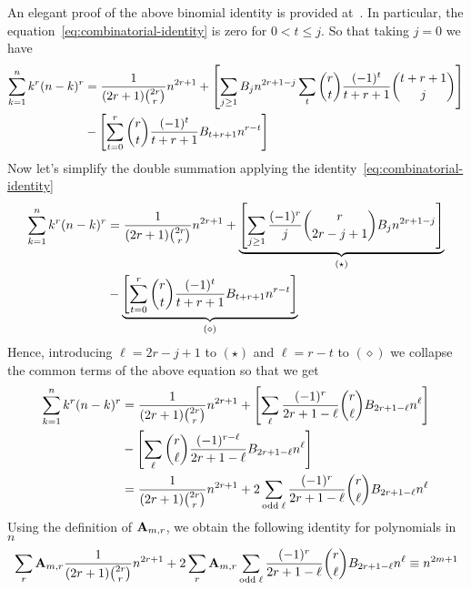 An elegant proof of the above binomial identity is provided at~\cite{scheuer2023mathstackexchange}.
In particular, the equation~\eqref{eq:combinatorial-identity} is zero for $0< t \leq j$.
So that taking $j=0$ we have
\begin{equation*}
    \begin{split}
        \sum_{k=1}^{n} k^{r} (n-k)^{r}
        &= \frac{1}{(2r+1) \binom{2r}r} n^{2r+1} + \left[ \sum_{j \geq 1} {B}\sb{j} n^{2r+1-j} \sum_{t} \binom{r}{t} \frac{(-1)^t}{t+r+1} \binom{t+r+1}{j} \right] \\
        &- \left[ \sum_{t=0}^{r} \binom{r}{t} \frac{(-1)^t}{t+r+1} {B}\sb{t+r+1} n^{r-t} \right]
    \end{split}
\end{equation*}
Now let's simplify the double summation applying the identity~\eqref{eq:combinatorial-identity}
\begin{equation*}
    \begin{split}
        \sum_{k=1}^{n} k^{r} (n-k)^{r}
        &= \frac{1}{(2r+1) \binom{2r}r} n^{2r+1}
        + \underbrace{\left[ \sum_{j \geq 1} \frac{(-1)^r}{j} \binom{r}{2r-j+1} {B}\sb{j} n^{2r+1-j} \right]}_{(\star)} \\
        &- \underbrace{\left[ \sum_{t=0}^{r} \binom{r}{t} \frac{(-1)^t}{t+r+1} {B}\sb{t+r+1} n^{r-t} \right]}_{(\diamond)}
    \end{split}
\end{equation*}
Hence, introducing $\ell=2r-j+1$ to $(\star)$ and $\ell=r-t$ to $(\diamond)$ we collapse the common terms of the above
equation so that we get
\begin{equation*}
    \begin{split}
        \sum_{k=1}^{n} k^{r} (n-k)^{r}
        &= \frac{1}{(2r+1) \binom{2r}r} n^{2r+1}
        + \left[ \sum_{\ell} \frac{(-1)^r}{2r+1-\ell} \binom{r}{\ell} {B}\sb{2r+1-\ell} n^{\ell} \right] \\
        &- \left[ \sum_{\ell} \binom{r}{\ell} \frac{(-1)^{r-\ell}}{2r+1-\ell} {B}\sb{2r+1-\ell} n^{\ell} \right]\\
        &= \frac{1}{(2r+1) \binom{2r}r} n^{2r+1} + 2 \sum_{\mathrm{odd \; \ell}} \frac{(-1)^r}{2r+1-\ell} \binom{r}{\ell} {B}\sb{2r+1-\ell} n^{\ell}
    \end{split}
\end{equation*}
Using the definition of ${\mathbf{A}} \sb{m,r}$, we obtain the following identity for polynomials in $n$
\begin{equation*}
    \sum_{r} {\mathbf{A}} \sb{m,r} \frac{1}{(2r+1) \binom{2r}r} n^{2r+1}
    + 2 \sum_{r} {\mathbf{A}} \sb{m,r} \sum_{\mathrm{odd \; \ell}} \frac{(-1)^r}{2r+1-\ell} \binom{r}{\ell} {B}\sb{2r+1-\ell} n^{\ell}
    \equiv n^{2m+1}
\end{equation*}
